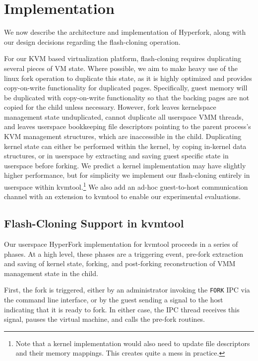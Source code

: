 
\section{Implementation}

We now describe the architecture and implementation of Hyperfork, along with
our design decisions regarding the flash-cloning operation.

For our KVM based virtualization platform, flash-cloning requires duplicating
several pieces of VM state. Where possible, we aim to make heavy use of the
linux fork operation to duplicate this state, as it is highly optimized and
provides copy-on-write functionality for duplicated pages. Specifically, guest
memory will be duplicated with copy-on-write functionality so that the backing
pages are not copied for the child unless necessary. However, fork leaves
kernelspace management state unduplicated, cannot duplicate all userspace VMM
threads, and leaves userspace bookkeeping file descriptors pointing to the
parent process's KVM management structures, which are inaccessible in the
child. Duplicating kernel state can either be performed within the kernel, by
coping in-kernel data structures, or in userspace by extracting and saving
guest specific state in userspace before forking. We predict a kernel
implementation may have slightly higher performance, but for simplicity we
implement our flash-cloning entirely in userspace within kvmtool.\footnote{Note
that a kernel implementation would also need to update file descriptors and
their memory mappings. This creates quite a mess in practice.} We also add an
ad-hoc guest-to-host communication channel with an extension to kvmtool to
enable our experimental evaluations.

\subsection{Flash-Cloning Support in kvmtool}

Our userspace HyperFork implementation for kvmtool proceeds in a series of
phases. At a high level, these phases are a triggering event, pre-fork
extraction and saving of kernel state, forking, and post-forking reconstruction
of VMM management state in the child.

First, the fork is triggered, either by an administrator invoking the
\texttt{FORK} IPC via the command line interface, or by the guest sending a
signal to the host indicating that it is ready to fork. In either case, the IPC
thread receives this signal, pauses the virtual machine, and calls the pre-fork
routines.

